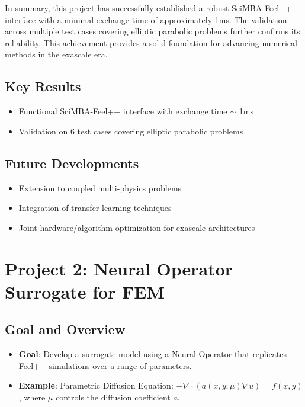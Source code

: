\documentclass{article}
\begin{document}
In summary, this project has successfully established a robust SciMBA-Feel++ interface with a minimal exchange time of approximately 1ms. The validation across multiple test cases covering elliptic parabolic problems further confirms its reliability. This achievement provides a solid foundation for advancing numerical methods in the exascale era.

\subsection{Key Results}

\begin{itemize}
    \item Functional SciMBA-Feel++ interface with exchange time $\sim$ 1ms
    \item Validation on 6 test cases covering elliptic parabolic problems
\end{itemize}

\subsection{Future Developments}

\begin{itemize}
    \item Extension to coupled multi-physics problems
    \item Integration of transfer learning techniques
    \item Joint hardware/algorithm optimization for exascale architectures
\end{itemize}

\section{Project 2: Neural Operator Surrogate for FEM}

\subsection{Goal and Overview}
\begin{itemize}
    \item \textbf{Goal}: Develop a surrogate model using a Neural Operator that replicates Feel++ simulations over a range of parameters.
    \item \textbf{Example}: Parametric Diffusion Equation: $-\nabla \cdot (a(x, y; \mu)\nabla u) = f(x, y)$, where $\mu$ controls the diffusion coefficient $a$.
\end{itemize}
\end{document}

